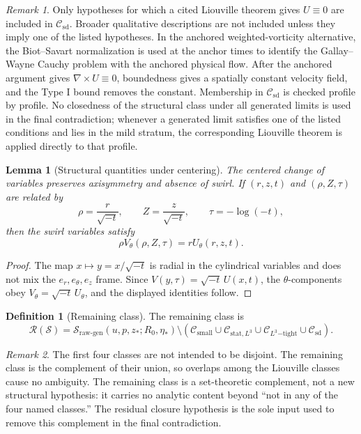 \documentclass[11pt]{amsart}
\theoremstyle{plain}
\newtheorem{lemma}[lemma]{Lemma}
\theoremstyle{definition}
\newtheorem{definition}[definition]{Definition}
\theoremstyle{remark}
\newtheorem{remark}[remark]{Remark}
\numberwithin{equation}{section}
\newcommand{\calS}{\mathcal S}
\newcommand{\calR}{\mathcal R}
\newcommand{\calC}{\mathcal C}
\begin{document}
\begin{remark}
Only hypotheses for which a cited Liouville theorem gives \(U\equiv0\) are
included in \(\calC_{\mathrm{sd}}\).  Broader qualitative descriptions are
not included unless they imply one of the listed hypotheses.  In the
anchored weighted-vorticity alternative, the Biot--Savart normalization
is used at the anchor times to identify the Gallay--Wayne Cauchy problem with
the anchored physical flow.  After the anchored argument gives
\(\nabla\times U\equiv0\), boundedness gives a spatially constant velocity
field, and the Type I bound removes the constant.
Membership in \(\calC_{\mathrm{sd}}\) is checked profile by profile.  No
closedness of the structural class under all generated limits is used in the
final contradiction; whenever a generated limit satisfies one of the listed
conditions and lies in the mild stratum, the corresponding Liouville theorem is
applied directly to that profile.
\end{remark}

\begin{lemma}[Structural quantities under centering]
\label{p1:lem:structure-centering}
The centered change of variables preserves axisymmetry and absence of swirl.
If \((r,z,t)\) and \((\rho,Z,\tau)\) are related by
\[
   \rho=\frac r{\sqrt{-t}},\qquad Z=\frac z{\sqrt{-t}},
   \qquad \tau=-\log(-t),
\]
then the swirl variables satisfy
\[
   \rho V_\theta(\rho,Z,\tau)=rU_\theta(r,z,t).
\]
\end{lemma}

\begin{proof}
The map \(x\mapsto y=x/\sqrt{-t}\) is radial in the cylindrical variables and
does not mix the \(e_r,e_\theta,e_z\) frame.  Since
\(V(y,\tau)=\sqrt{-t}\,U(x,t)\), the \(\theta\)-components obey
\(V_\theta=\sqrt{-t}\,U_\theta\), and the displayed identities follow.
\end{proof}

\begin{definition}[Remaining class]\label{p1:def:remaining-class}
The remaining class is
\[
   \calR(\calS)
   =
   \calS_{\mathrm{raw\text{-}gen}}(u,p,z_*;R_0,\eta_*)
   \setminus
   \left(
      \calC_{\mathrm{small}}
      \cup
      \calC_{\mathrm{stat},L^3}
      \cup
      \calC_{L^3\mathrm{-tight}}
      \cup
      \calC_{\mathrm{sd}}
   \right).
\]
\end{definition}

\begin{remark}
The first four classes are not intended to be disjoint.  The remaining class is
the complement of their union, so overlaps among the Liouville classes cause no
ambiguity.  The remaining class is a set-theoretic complement, not a new
structural hypothesis: it carries no analytic content beyond ``not in any of
the four named classes.''  The residual closure hypothesis
 is the sole input used to remove this complement in
the final contradiction.
\end{remark}
\end{document}
